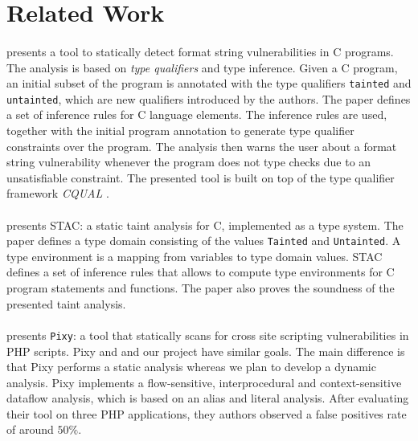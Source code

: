 \section{Related Work}\label{sec:related}

\paragraph{\cite{Shankar:2001:DFS}} presents a tool to statically
detect format string vulnerabilities in C programs. The analysis
is based on \textit{type qualifiers} and type inference. Given a C program,
an initial subset of the program is annotated with the type qualifiers
\texttt{tainted} and \texttt{untainted}, which are new qualifiers
introduced by the authors. The paper defines a set
of inference rules for C language elements. The inference rules are used,
together with the initial program annotation to generate type qualifier
constraints over the program. The analysis then warns the user
about a format string vulnerability whenever the program does not
type checks due to an unsatisfiable constraint. The presented tool
is built on top of the type qualifier framework \textit{CQUAL} 
\cite{Foster:pldi99}.

\paragraph{\cite{Dimitru:2009:STAC}} presents STAC: a static taint
analysis for C, implemented as a type system. The paper defines a type
domain consisting of the values \texttt{Tainted} and \texttt{Untainted}.
A type environment is a mapping from variables to type domain values.
STAC defines a set of inference rules that allows to compute
type environments for C program statements and functions. The paper
also proves the soundness of the presented taint analysis.

\paragraph{\cite{Jovanovic:2006:Pixy}} presents \texttt{Pixy}: a tool
that statically scans for cross site scripting vulnerabilities in PHP
scripts. Pixy and and our project have similar goals. The main
difference is that Pixy performs a static analysis whereas we plan
to develop a dynamic analysis. Pixy implements a flow-sensitive,
interprocedural and context-sensitive dataflow analysis, which
is based on an alias and literal analysis. After evaluating
their tool on three PHP applications, they authors observed 
a false positives rate of around $50\%$.

